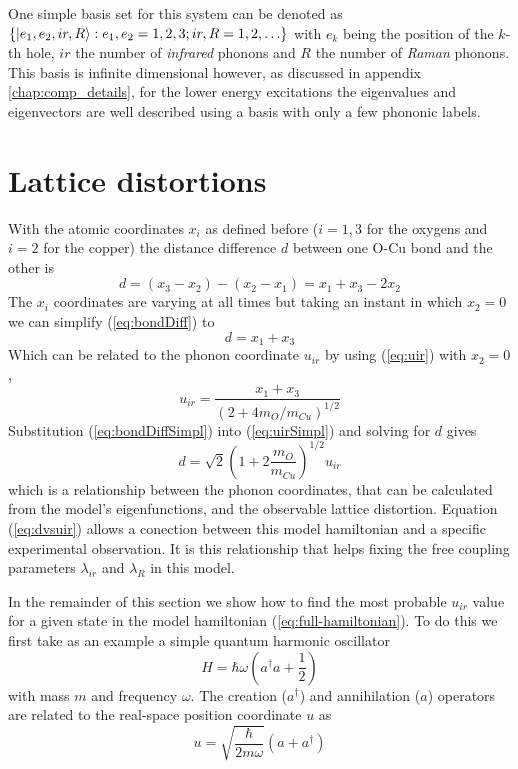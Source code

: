 One simple basis set for this system can be denoted as $\{\left | e_1,e_2,ir,R \right\rangle: e_1,e_2=1,2,3; ir,R=1,2,\ldots\}$ with $e_k$ being the position of the $k$-th hole, $ir$ the number of \textit{infrared} phonons and $R$ the number of \textit{Raman} phonons. 
This basis is infinite dimensional however, as discussed in appendix \ref{chap:comp_details}, for the lower energy excitations the eigenvalues and eigenvectors are well described using a basis with only a few phononic labels.

\section{Lattice distortions}
\label{sec:lattice-distortions}

With the atomic coordinates $x_i$ as defined before ($i=1,3$ for the oxygens and $i=2$ for the copper) the distance difference $d$ between one O-Cu bond and the other is
%
\begin{equation}
  \label{eq:bondDiff}
  d =  (x_3 - x_2) - (x_2 - x_1) = x_1 + x_3 - 2x_2 
\end{equation}
%
The $x_i$ coordinates are varying at all times but taking an instant in which $x_2=0$ we can simplify (\ref{eq:bondDiff}) to
%
\begin{equation}
  \label{eq:bondDiffSimpl}
  d = x_1+x_3
\end{equation}
%
Which can be related to the phonon coordinate $u_{ir}$ by using (\ref{eq:uir}) with $x_2=0$,
%
\begin{equation}
  \label{eq:uirSimpl}
  u_{ir}=\frac{x_1+x_3}{\left( 2+4 m_O/m_{Cu} \right)^{1/2}}
\end{equation}
%
Substitution (\ref{eq:bondDiffSimpl}) into (\ref{eq:uirSimpl}) and solving for $d$ gives
%
\begin{equation}
  \label{eq:dvsuir}
  d=\sqrt{2}\left(1 + 2\frac{m_O}{m_{Cu}} \right)^{1/2}u_{ir}
\end{equation}
%
which is a relationship between the phonon coordinates, that can be calculated from the model's eigenfunctions, and the observable lattice distortion.
Equation (\ref{eq:dvsuir}) allows a conection between this model hamiltonian and a specific experimental observation. 
It is this relationship that helps fixing the free coupling parameters $\lambda_{ir}$ and $\lambda_R$ in this model.

In the remainder of this section we show how to find the most probable $u_{ir}$ value for a given state in the model hamiltonian (\ref{eq:full-hamiltonian}).
To do this we first take as an example a simple quantum harmonic oscillator 
%
\begin{equation}
  \label{eq:harmOscHam}
  H=\hbar\omega \left(a^\dagger a + \frac{1}{2}\right)
\end{equation}
with mass $m$ and frequency $\omega$.
The creation ($a^\dagger$) and annihilation ($a$) operators are related to the real-space position coordinate $u$ as
%
\begin{equation}
  \label{eq:harmOscRel}
  u=\sqrt{\frac{\hbar}{2m\omega}}\left(a+a^\dagger\right)
\end{equation}

